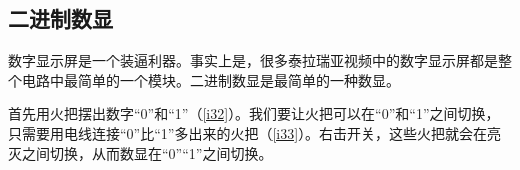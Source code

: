 \begin{figure}[!ht]
\begin{center}
\end{center}
\caption{}
\label{i7:10}
\end{figure}

\subsection{二进制数显}

数字显示屏是一个装逼利器。事实上是，很多泰拉瑞亚视频中的数字显示屏都是整个电路中最简单的一个模块。二进制数显是最简单的一种数显。

首先用火把摆出数字“0”和“1”（\autoref{i32}）。我们要让火把可以在“0”和“1”之间切换，只需要用电线连接“0”比“1”多出来的火把（\autoref{i33}）。右击开关，这些火把就会在亮灭之间切换，从而数显在“0”“1”之间切换。

